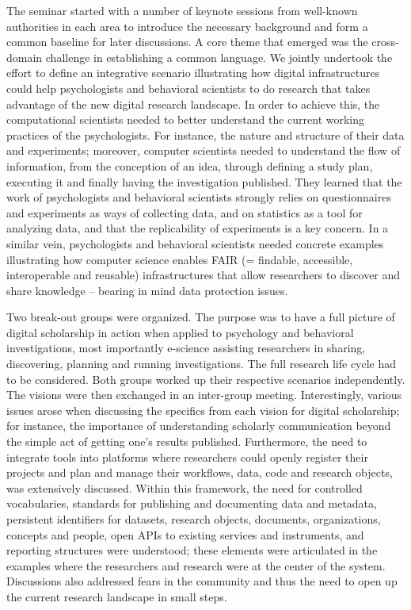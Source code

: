 \documentclass[a4paper,USenglish]{dagrep}
\begin{document}
The seminar started with a number of keynote sessions from well-known
authorities in each area to introduce the necessary background and form a common
baseline for later discussions. A core theme that emerged was the cross-domain
challenge in establishing a common language.  We jointly undertook the effort to
define an integrative scenario illustrating how digital infrastructures could
help psychologists and behavioral scientists to do research that takes advantage
of the new digital research landscape. In order to achieve this, the
computational scientists needed to better understand the current working
practices of the psychologists. For instance, the nature and structure of their
data and experiments; moreover, computer scientists needed to understand the
flow of information, from the conception of an idea, through defining a study
plan, executing it and finally having the investigation published. They learned
that the work of psychologists and behavioral scientists strongly relies on
questionnaires and experiments as ways of collecting data, and on statistics as
a tool for analyzing data, and that the replicability of experiments is a key
concern. In a similar vein, psychologists and behavioral scientists needed
concrete examples illustrating how computer science enables FAIR (= findable,
accessible, interoperable and reusable) infrastructures that allow researchers
to discover and share knowledge – bearing in mind data protection issues. 

Two break-out groups were organized. The purpose was to have a full picture of
digital scholarship in action when applied to psychology and behavioral
investigations, most importantly e-science assisting researchers in sharing,
discovering, planning and running investigations. The full research life cycle
had to be considered. Both groups worked up their respective scenarios
independently. The visions were then exchanged in an inter-group meeting.
Interestingly, various issues arose when discussing the specifics from each
vision for digital scholarship; for instance, the importance of understanding
scholarly communication beyond the simple act of getting one's results
published. Furthermore, the need to integrate tools into platforms where
researchers could openly register their projects and plan and manage their
workflows, data, code and research objects, was extensively discussed. Within
this framework, the need for controlled vocabularies, standards for publishing
and documenting data and metadata, persistent identifiers for datasets, research
objects, documents, organizations, concepts and people, open APIs to existing
services and instruments, and reporting structures were understood; these
elements were articulated in the examples where the researchers and research
were at the center of the system. Discussions also addressed fears in the
community and thus the need to open up the current research landscape in small
steps.
\end{document}
